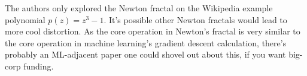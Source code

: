 \documentclass[sigconf,authorversion,nonacm]{acmart}
\begin{document}
The authors only explored the Newton fractal on the Wikipedia example polynomial $p(z) = z^3-1$. It's possible other Newton
fractals would lead to more cool distortion. As the core operation in Newton's fractal is very similar to the 
core operation in machine learning's gradient descent calculation, there's probably an ML-adjacent paper one could 
shovel out about this, if you want big-corp funding.


    
    
    
\end{document}
